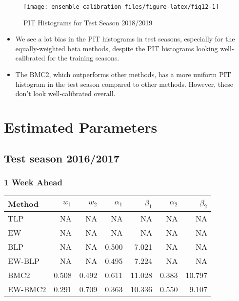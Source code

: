 \documentclass[
]{article}
\begin{document}
\begin{figure}[H]

{\centering \texttt{[image: ensemble\_calibration\_files/figure-latex/fig12-1]} 

}

\caption{PIT Histograms for Test Season 2018/2019}\label{fig:fig12}
\end{figure}

\begin{itemize}
\item We see a lot bias in the PIT histograms in test seasons, especially for the equally-weighted beta methods, despite the PIT histograms looking well-calibrated for the training seasons.
\item The BMC2, which outperforms other methods, has a more uniform PIT histogram in the test season compared to other methods. However, these don't look well-calibrated overall.
\end{itemize}

\hypertarget{estimated-parameters}{%
\section{Estimated Parameters}\label{estimated-parameters}}

\hypertarget{test-season-20162017-1}{%
\subsection{Test season 2016/2017}\label{test-season-20162017-1}}

\hypertarget{week-ahead-12}{%
\subsubsection{1 Week Ahead}\label{week-ahead-12}}

\begin{tabular}{lrrrrrr}
\toprule
Method & $w_1$ & $w_2$ & $\alpha_1$ & $\beta_1$ & $\alpha_2$ & $\beta_2$\\
\midrule
TLP & NA & NA & NA & NA & NA & NA\\
EW & NA & NA & NA & NA & NA & NA\\
BLP & NA & NA & 0.500 & 7.021 & NA & NA\\
EW-BLP & NA & NA & 0.495 & 7.224 & NA & NA\\
BMC2 & 0.508 & 0.492 & 0.611 & 11.028 & 0.383 & 10.797\\
EW-BMC2 & 0.291 & 0.709 & 0.363 & 10.336 & 0.550 & 9.107\\
\bottomrule
\end{tabular}
\end{document}

